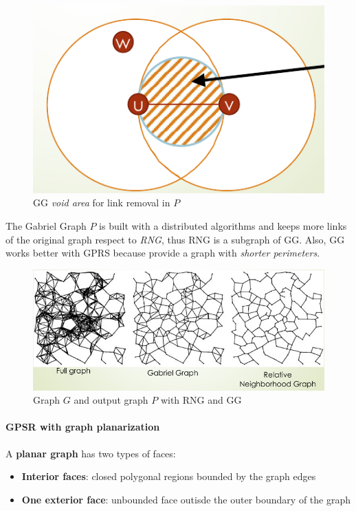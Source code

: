 \documentclass[10pt,a4paper]{report}
\theoremstyle{definition}
\begin{document}
\begin{figure}[h]
	\centering\includegraphics[scale=0.30]{images/Pasted image 20230523153953.png}
	\caption{GG \textit{void area} for link removal in $P$}
\end{figure}

The Gabriel Graph $P$ is built with a distributed algorithms and keeps more links of the original graph respect to \textit{RNG}, thus RNG is a subgraph of GG. Also, GG works better with GPRS because provide a graph with \textit{shorter perimeters}.
\begin{figure}[h]
	\centering\includegraphics[scale=0.50]{images/Pasted image 20230523154039.png}
	\caption{Graph $G$ and output graph $P$ with RNG and GG}
\end{figure}

\paragraph{GPSR with graph planarization}
\label{sec:gpsr-with-graph-planarization}
A \textbf{planar graph} has two types of faces:
\begin{itemize}
	\item 
	\textbf{Interior faces}: closed polygonal regions bounded by the graph edges
	\item 
	\textbf{One exterior face}: unbounded face outisde the outer boundary of the graph
	
	
\end{itemize}
\end{document}
